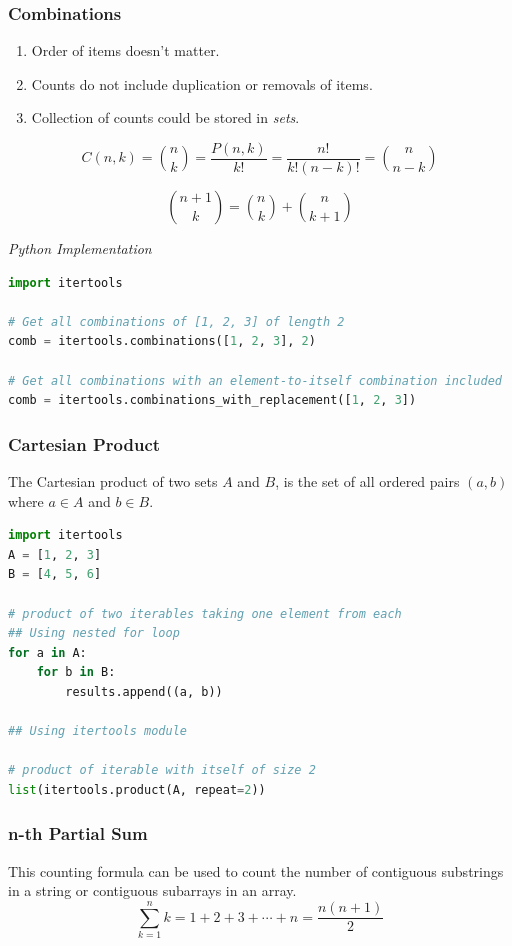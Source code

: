 \documentclass{article}
\begin{document}
    \subsubsection{Combinations}
    \begin{enumerate}
        \item Order of items doesn't matter. 
        \item Counts do not include duplication or removals of items.
        \item Collection of counts could be stored in \emph{sets}.
    \end{enumerate}
    
    \[
       C(n, k) = \binom{n}{k} = \frac{P(n,k)}{k!} = \frac{n!}{k!(n-k)!} = \binom{n}{n-k}
    \]
    
    \[
        \binom{n+1}{k} = \binom{n}{k} + \binom{n}{k+1}
    \]

\vspace{8pt} \emph{Python Implementation}
\begin{lstlisting}[language=Python]
import itertools

# Get all combinations of [1, 2, 3] of length 2 
comb = itertools.combinations([1, 2, 3], 2)

# Get all combinations with an element-to-itself combination included 
comb = itertools.combinations_with_replacement([1, 2, 3])
\end{lstlisting}

    \subsubsection{Cartesian Product}
    The Cartesian product of two sets $A$ and $B$, is the set of all ordered pairs $(a, b)$ where $a \in A$ and $b \in B$.

\begin{lstlisting}[language=Python]
import itertools
A = [1, 2, 3]
B = [4, 5, 6]

# product of two iterables taking one element from each
## Using nested for loop
for a in A: 
    for b in B:
        results.append((a, b))

## Using itertools module

# product of iterable with itself of size 2
list(itertools.product(A, repeat=2))
\end{lstlisting}

    \subsubsection{n-th Partial Sum}
    This counting formula can be used to count the number of contiguous substrings in a string or contiguous subarrays in an array.
    \[
        \sum_{k=1}^n k = 1 + 2 + 3 + \cdots + n = \frac{n(n+1)}{2} 
    \]
    
\end{document}
